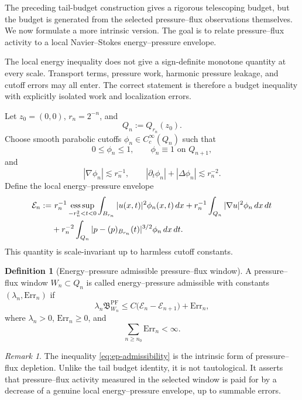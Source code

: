 \documentclass[11pt]{article}
\numberwithin{equation}{section}
\theoremstyle{plain}
\theoremstyle{definition}
\newtheorem{definition}[theorem]{Definition}
\theoremstyle{remark}
\newtheorem{remark}[theorem]{Remark}
\newcommand{\PF}{\mathrm{PF}}
\newcommand{\Err}{\mathrm{Err}}
\newcommand{\esssup}{\operatorname*{ess\,sup}}
\newcommand{\calE}{\mathcal E}
\newcommand{\bfB}{\mathfrak B}
\begin{document}
The preceding tail-budget construction gives a rigorous telescoping budget, but the budget is generated from the selected pressure--flux observations themselves.  We now formulate a more intrinsic version.  The goal is to relate pressure--flux activity to a local Navier--Stokes energy--pressure envelope.

The local energy inequality does not give a sign-definite monotone quantity at every scale.  Transport terms, pressure work, harmonic pressure leakage, and cutoff errors may all enter.  The correct statement is therefore a budget inequality with explicitly isolated work and localization errors.

Let \(z_0=(0,0)\), \(r_n=2^{-n}\), and
\[
        Q_n:=Q_{r_n}(z_0).
\]
Choose smooth parabolic cutoffs \(\phi_n\in C_c^\infty(Q_n)\) such that
\[
        0\le\phi_n\le1,
        \qquad
        \phi_n\equiv1 \text{ on } Q_{n+1},
\]
and
\begin{equation}
        |\nabla\phi_n|\lesssim r_n^{-1},
        \qquad
        |\partial_t\phi_n|+|\Delta\phi_n|\lesssim r_n^{-2}.
        \label{eq:dyadic-cutoff-bounds}
\end{equation}
Define the local energy--pressure envelope
\begin{align}
        \calE_n
        :=&\
        r_n^{-1}\esssup_{-r_n^2<t<0}
        \int_{B_{r_n}}|u(x,t)|^2\phi_n(x,t)\,dx
        +
        r_n^{-1}\int_{Q_n}|\nabla u|^2\phi_n\,dx\,dt
        \notag\\
        &+
        r_n^{-2}\int_{Q_n}|p-(p)_{B_{r_n}}(t)|^{3/2}\phi_n\,dx\,dt.
        \label{eq:energy-pressure-envelope}
\end{align}
This quantity is scale-invariant up to harmless cutoff constants.

\begin{definition}[Energy--pressure admissible pressure--flux window]
\label{def:ep-admissible-pf-window}
A pressure--flux window \(W_n\subset Q_n\) is called energy--pressure admissible with constants \((\lambda_n,\Err_n)\) if
\begin{equation}
        \lambda_n\bfB^{\PF}_{W_n}
        \le
        C\bigl(\calE_n-\calE_{n+1}\bigr)+\Err_n,
        \label{eq:ep-admissibility}
\end{equation}
where \(\lambda_n>0\), \(\Err_n\ge0\), and
\[
        \sum_{n\ge n_0}\Err_n<\infty.
\]
\end{definition}

\begin{remark}
The inequality \eqref{eq:ep-admissibility} is the intrinsic form of pressure--flux depletion.  Unlike the tail budget identity, it is not tautological.  It asserts that pressure--flux activity measured in the selected window is paid for by a decrease of a genuine local energy--pressure envelope, up to summable errors.
\end{remark}
\end{document}
